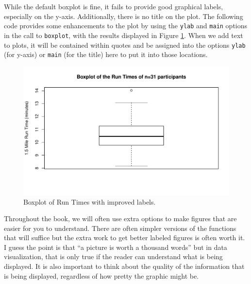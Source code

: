 \documentclass[]{article}
\newenvironment{Shaded}{\begin{snugshade}}{\end{snugshade}}
\newcommand{\KeywordTok}[1]{\textcolor[rgb]{0.13,0.29,0.53}{\textbf{{#1}}}}
\newcommand{\DataTypeTok}[1]{\textcolor[rgb]{0.13,0.29,0.53}{{#1}}}
\newcommand{\StringTok}[1]{\textcolor[rgb]{0.31,0.60,0.02}{{#1}}}
\newcommand{\NormalTok}[1]{{#1}}
\begin{document}
While the default boxplot is fine, it fails to provide good graphical
labels, especially on the y-axis. Additionally, there is no title on the
plot. The following code provides some enhancements to the plot by using
the \texttt{ylab} and \texttt{main} options in the call to
\texttt{boxplot}, with the results displayed in Figure
\ref{fig:Figure9}. When we add text to plots, it will be contained
within quotes and be assigned into the options \texttt{ylab} (for
y-axis) or \texttt{main} (for the title) here to put it into those
locations.



\begin{Shaded}
\end{Shaded}

\begin{figure}[htbp]
\centering
\includegraphics{01-preface_files/figure-latex/Figure9-1.pdf}
\caption{\label{fig:Figure9}Boxplot of Run Times with improved labels.}
\end{figure}

Throughout the book, we will often use extra options to make figures
that are easier for you to understand. There are often simpler versions
of the functions that will suffice but the extra work to get better
labeled figures is often worth it. I guess the point is that ``a picture
is worth a thousand words'' but in data visualization, that is only true
if the reader can understand what is being displayed. It is also
important to think about the quality of the information that is being
displayed, regardless of how pretty the graphic might be.
\end{document}
